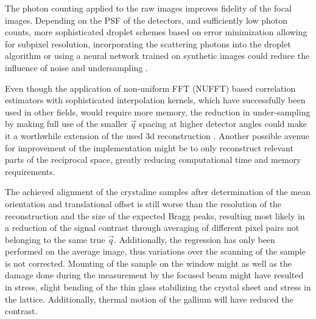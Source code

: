 The photon counting applied to the raw images improves fidelity of the focal images. Depending on the PSF of the detectors, and sufficiently low photon counts, more sophisticated droplet schemes based on error minimization allowing for subpixel resolution, incorporating the scattering photons into the droplet algorithm or using a neural network trained on synthetic images could reduce the influence of noise and undersampling \cite{baumann2018,collaboration2014,schayck2020,sun2020}.




Even though the application of non-uniform FFT (NUFFT) based correlation estimators with sophisticated interpolation kernels, which have  successfully been used in other fields, would require more memory, the reduction in under-sampling by making full use of the smaller $\vec{q}$ spacing at higher detector angles could make it a worthwhile extension of the used 3d reconstruction \cite{laguna1998,yang2008,chang2020}. Another possible avenue for improvement of the implementation might be to only reconstruct relevant parts of the reciprocal space, greatly reducing computational time and memory requirements. 



The achieved alignment of the crystaline samples after determination of the mean orientation and translational offset is still worse than the resolution of the reconstruction and the size of the expected Bragg peaks, resulting most likely in a reduction of the signal contrast through averaging of different pixel pairs not belonging to the same true $\vec{q}$. Additionally, the regression has only been performed on the average image, thus variations over the scanning of the sample is not corrected. Mounting of the sample on the window might as well as the damage done during the measurement by the focused beam might have resulted in stress, slight bending of the thin glass stabilizing the crystal sheet and stress in the lattice. Additionally, thermal motion of the gallium will have reduced the contrast.